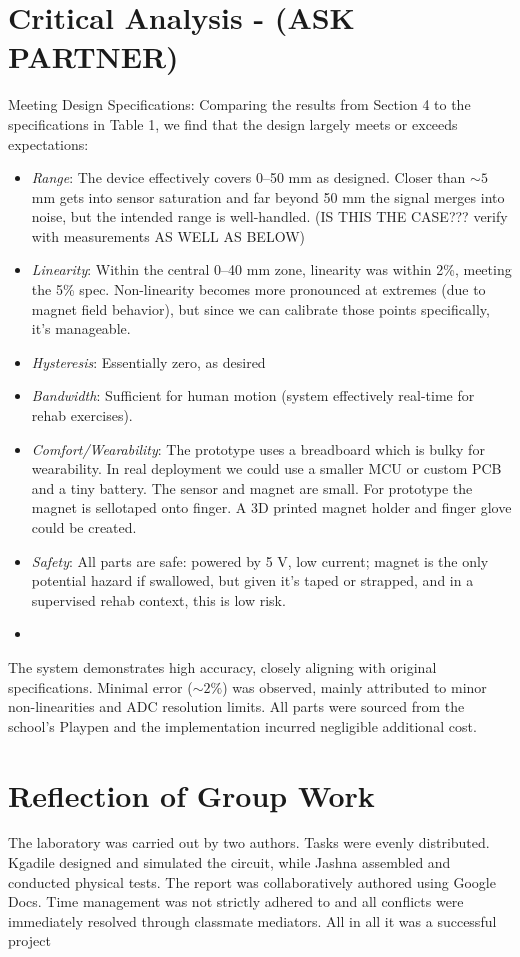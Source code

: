 \documentclass[a4paper,12pt]{article}
\begin{document}
\section{Critical Analysis - (ASK PARTNER)}
Meeting Design Specifications: Comparing the results from Section 4 to the specifications in Table 1, we find that the design largely meets or exceeds expectations:
\begin{itemize}
	\item \emph{Range}: The device effectively covers 0–50 mm as designed. Closer than $\sim 5$ mm gets into sensor saturation and far beyond 50 mm the signal merges into noise, but the intended range is well-handled. (IS THIS THE CASE??? verify with measurements AS WELL AS BELOW)
	\item \emph{Linearity}: Within the central 0–40 mm zone, linearity was within 2\%, meeting the 5\% spec. Non-linearity becomes more pronounced at extremes (due to magnet field behavior), but since we can calibrate those points specifically, it’s manageable.
	\item \emph{Hysteresis}: Essentially zero, as desired
	\item \emph{Bandwidth}: Sufficient for human motion (system effectively real-time for rehab exercises).
	\item \emph{Comfort/Wearability}: The prototype uses a breadboard which is bulky for wearability. In real deployment we could use a smaller MCU or custom PCB and a tiny battery. The sensor and magnet are small. For prototype the magnet is sellotaped onto finger. A 3D printed magnet holder and finger glove could be created.
	\item \emph{Safety}: All parts are safe: powered by 5 V, low current; magnet is the only potential hazard if swallowed, but given it’s taped or strapped, and in a supervised rehab context, this is low risk.
	\item 
\end{itemize}

The system demonstrates high accuracy, closely aligning with original specifications. Minimal error ($\sim 2\%$) was observed, mainly attributed to minor non-linearities and ADC resolution limits. All parts were sourced from the school's Playpen and the implementation incurred negligible additional cost.


%
\section{Reflection of Group Work}
The laboratory was carried out by two authors. Tasks were evenly distributed. Kgadile designed and simulated the circuit, while Jashna assembled and conducted physical tests. The report was collaboratively authored using Google Docs. Time management was not strictly adhered to and all conflicts were immediately resolved through classmate mediators. All in all it was a successful project 
\end{document}
